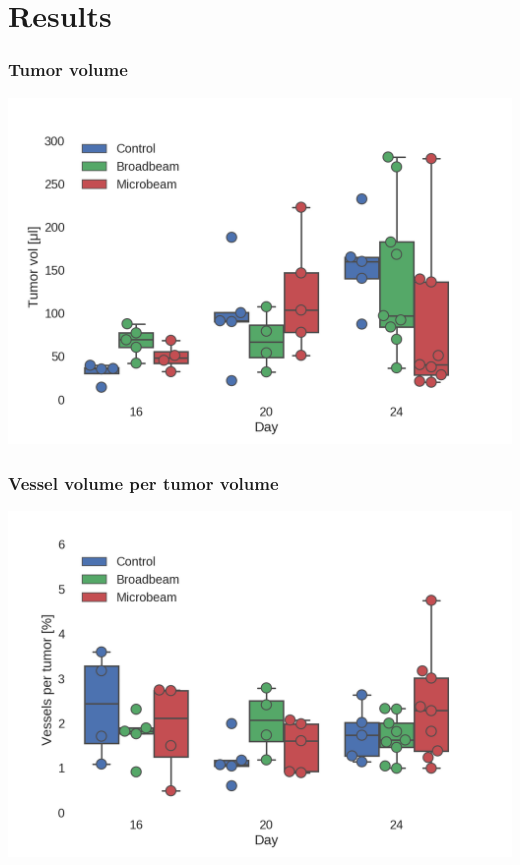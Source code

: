 \documentclass[]{beamer}
\newcommand{\imsize}{\linewidth} %
\begin{document}
\section{Results}
\renewcommand{\imsize}{0.9\linewidth}
\begin{frame}
	\frametitle{Tumor volume}
	\includegraphics[width=\imsize]{img/talk_tumor_volume_day}	
\end{frame}

\begin{frame}
	\frametitle{Vessel volume per tumor volume}
	\includegraphics[width=\imsize]{img/talk_vessel_ratio_day}	
\end{frame}
\end{document}
